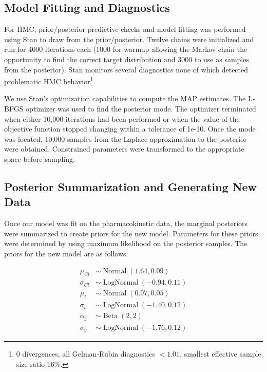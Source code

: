 \subsection*{Model Fitting and Diagnostics}

For HMC, prior/posterior predictive checks and model fitting was performed using Stan \citep{Carpenter2017-qf} to draw from the prior/posterior.  Twelve chains were initialized and run for 4000 iterations each (1000 for warmup allowing the Markov chain the opportunity to find the correct target distribution and 3000 to use as samples from the posterior). Stan monitors several diagnostics none of which detected problematic HMC behavior\footnote{0 divergences, all Gelman-Rubin diagnostics $<1.01$, smallest effective sample size ratio 16\%.}.

We use Stan’s optimization capabilities to compute the MAP estimates.  The L-BFGS optimizer was used to find the posterior mode.  The optimizer terminated when either 10,000 iterations had been performed or when the value of the objective function stopped changing within a tolerance of 1e-10. Once the mode was located, 10,000 samples from the Laplace approximation to the posterior were obtained. Constrained parameters were transformed to the appropriate space before sampling.

\subsection*{Posterior Summarization and Generating New Data}

Once our model was fit on the pharmacokinetic data, the marginal posteriors were summarized to create priors for the new model.  Parameters for these priors were determined by using maximum likelihood on the posterior samples.  The priors for the new model are as follows:

\begin{align}
	\mu_{\mathit{Cl}} &\sim \operatorname{Normal}(1.64, 0.09)  \label{eq:eq_18} \\
	\sigma_{\mathit{Cl}} &\sim \operatorname{LogNormal}(-0.94, 0.11)  \label{eq:eq_19} \\
	\mu_{t} &\sim \operatorname{Normal}(0.97, 0.05)   \label{eq:eq_20} \\
	\sigma_{t} &\sim \operatorname{LogNormal}(-1.40, 0.12)  \label{eq:eq_21} \\
	\alpha_j &\sim \operatorname{Beta}(2,2)  \label{eq:eq_22} \\
	\sigma_y &\sim \operatorname{LogNormal}(-1.76, 0.12)  \label{eq:eq_23}
\end{align}

